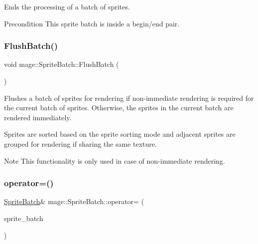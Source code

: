 Ends the processing of a batch of sprites.

\begin{DoxyPrecond}{Precondition}
This sprite batch is inside a begin/end pair. 
\end{DoxyPrecond}
\hypertarget{classmage_1_1_sprite_batch_a352714b5d02590245ab8ffe8489305f7}{}\label{classmage_1_1_sprite_batch_a352714b5d02590245ab8ffe8489305f7} 
\subsubsection{\texorpdfstring{Flush\+Batch()}{FlushBatch()}}
{\footnotesize\ttfamily void mage\+::\+Sprite\+Batch\+::\+Flush\+Batch (\begin{DoxyParamCaption}{ }\end{DoxyParamCaption})\hspace{0.3cm}{\ttfamily [private]}}

Flushes a batch of sprites for rendering if non-\/immediate rendering is required for the current batch of sprites. Otherwise, the sprites in the current batch are rendered immediately.

Sprites are sorted based on the sprite sorting mode and adjacent sprites are grouped for rendering if sharing the same texture.

\begin{DoxyNote}{Note}
This functionality is only used in case of non-\/immediate rendering. 
\end{DoxyNote}
\hypertarget{classmage_1_1_sprite_batch_aa2a5df588d7589a36b38b35dc8a08a48}{}\label{classmage_1_1_sprite_batch_aa2a5df588d7589a36b38b35dc8a08a48} 
\subsubsection{\texorpdfstring{operator=()}{operator=()}\hspace{0.1cm}{\footnotesize\ttfamily [1/2]}}
{\footnotesize\ttfamily \hyperlink{classmage_1_1_sprite_batch}{Sprite\+Batch}\& mage\+::\+Sprite\+Batch\+::operator= (\begin{DoxyParamCaption}\item[{const \hyperlink{classmage_1_1_sprite_batch}{Sprite\+Batch} \&}]{sprite\+\_\+batch }\end{DoxyParamCaption})\hspace{0.3cm}{\ttfamily [delete]}}

